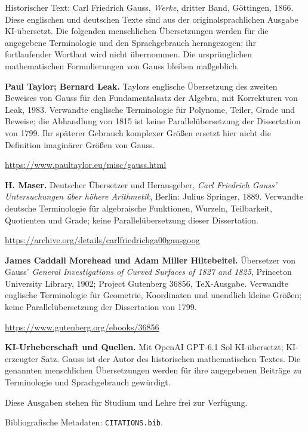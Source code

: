 \clearpage\thispagestyle{empty}\begingroup\small\raggedright
{}\medskip
Historischer Text: Carl Friedrich Gauss, \emph{Werke}, dritter Band, Göttingen, 1866. Diese englischen und deutschen Texte sind aus der originalsprachlichen Ausgabe KI-übersetzt. Die folgenden menschlichen Übersetzungen werden für die angegebene Terminologie und den Sprachgebrauch herangezogen; ihr fortlaufender Wortlaut wird nicht übernommen. Die ursprünglichen mathematischen Formulierungen von Gauss bleiben maßgeblich.
\par\medskip\textbf{Paul Taylor; Bernard Leak.} Taylors englische Übersetzung des zweiten Beweises von Gauss für den Fundamentalsatz der Algebra, mit Korrekturen von Leak, 1983. Verwandte englische Terminologie für Polynome, Teiler, Grade und Beweise; die Abhandlung von 1815 ist keine Parallelübersetzung der Dissertation von 1799. Ihr späterer Gebrauch komplexer Größen ersetzt hier nicht die Definition imaginärer Größen von Gauss.\par
\url{https://www.paultaylor.eu/misc/gauss.html}
\par\medskip\textbf{H. Maser.} Deutscher Übersetzer und Herausgeber, \emph{Carl Friedrich Gauss’ Untersuchungen über höhere Arithmetik}, Berlin: Julius Springer, 1889. Verwandte deutsche Terminologie für algebraische Funktionen, Wurzeln, Teilbarkeit, Quotienten und Grade; keine Parallelübersetzung dieser Dissertation.\par
\url{https://archive.org/details/carlfriedrichga00gausgoog}
\par\medskip\textbf{James Caddall Morehead und Adam Miller Hiltebeitel.} Übersetzer von Gauss’ \emph{General Investigations of Curved Surfaces of 1827 and 1825}, Princeton University Library, 1902; Project Gutenberg 36856, TeX-Ausgabe. Verwandte englische Terminologie für Geometrie, Koordinaten und unendlich kleine Größen; keine Parallelübersetzung der Dissertation von 1799.\par
\url{https://www.gutenberg.org/ebooks/36856}
\par\medskip\textbf{KI-Urheberschaft und Quellen.} Mit OpenAI GPT-6.1 Sol KI-übersetzt; KI-erzeugter Satz. Gauss ist der Autor des historischen mathematischen Textes. Die genannten menschlichen Übersetzungen werden für ihre angegebenen Beiträge zu Terminologie und Sprachgebrauch gewürdigt.
\par Diese Ausgaben stehen für Studium und Lehre frei zur Verfügung.\par
\par\medskip Bibliografische Metadaten: \texttt{CITATIONS.bib}.
\par\endgroup\clearpage
